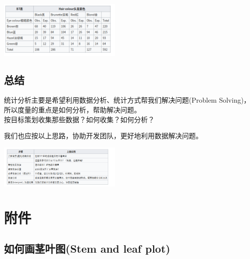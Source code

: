 \includegraphics[width=6cm]{Screenshotfrom2023-01-0222-21-11.png}

\begin{description}
\item[]
\end{description}


\hypertarget{ux5982ux4f55ux753bux830eux53f6ux56festem-and-leaf-plot}{%
\subsection{总结}\label{ux5982ux4f55ux753bux830eux53f6ux56festem-and-leaf-plot}}


统计分析主要是希望利用数据分析、统计方式帮我们解决问题(Problem
Solving)，所以度量的重点是如何分析，帮助解决问题。\\
按目标策划收集那些数据？如何收集？如何分析？

我们也应按以上思路，协助开发团队，更好地利用数据解决问题。

\includegraphics[width=6cm]{Screenshotfrom2023-04-1621-32-07.png}

\hypertarget{ux9644ux4ef6}{%
\section{附件}\label{ux9644ux4ef6}}

\hypertarget{ux5982ux4f55ux753bux830eux53f6ux56festem-and-leaf-plot}{%
\subsection{如何画茎叶图(Stem and leaf
plot)}\label{ux5982ux4f55ux753bux830eux53f6ux56festem-and-leaf-plot}}

